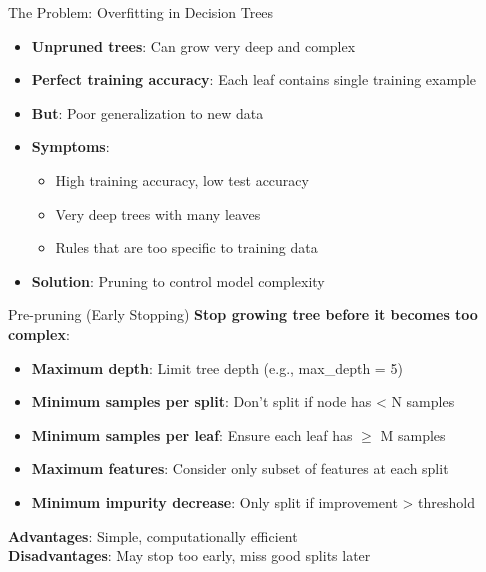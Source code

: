 \documentclass[usenames,dvipsnames]{beamer}
\begin{document}
\begin{frame}{The Problem: Overfitting in Decision Trees}
\begin{itemize}
\item \textbf{Unpruned trees}: Can grow very deep and complex
\pause
\item \textbf{Perfect training accuracy}: Each leaf contains single training example
\pause
\item \textbf{But}: Poor generalization to new data
\pause
\item \textbf{Symptoms}:
    \begin{itemize}
    \item High training accuracy, low test accuracy
    \pause
\item Very deep trees with many leaves
    \item Rules that are too specific to training data
    \end{itemize}
\item \textbf{Solution}: Pruning to control model complexity
\end{itemize}
\end{frame}

\begin{frame}{Pre-pruning (Early Stopping)}
\textbf{Stop growing tree before it becomes too complex}:
\begin{itemize}
\item \textbf{Maximum depth}: Limit tree depth (e.g., max\_depth = 5)
\pause
\item \textbf{Minimum samples per split}: Don't split if node has < N samples
\pause
\item \textbf{Minimum samples per leaf}: Ensure each leaf has $\geq$ M samples
\pause
\item \textbf{Maximum features}: Consider only subset of features at each split
\pause
\item \textbf{Minimum impurity decrease}: Only split if improvement > threshold
\end{itemize}

\textbf{Advantages}: Simple, computationally efficient \\
\textbf{Disadvantages}: May stop too early, miss good splits later
\end{frame}
\end{document}
